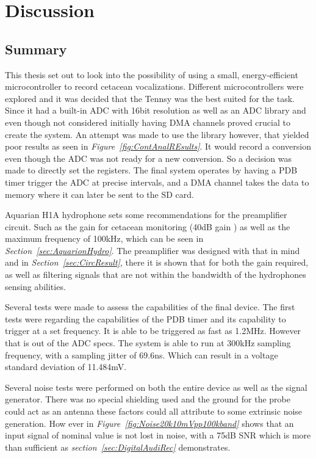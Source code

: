 \chapter{Discussion}

\section{Summary}

This thesis set out to look into the possibility of using a small, energy-efficient microcontroller to record cetacean vocalizations.
Different microcontrollers were explored and it was decided that the Tennsy was the best suited for the task.
Since it had a built-in ADC with 16bit resolution as well as an ADC library and even though not considered initially having DMA channels proved crucial to create the system.
An attempt was made to use the library however, that yielded poor results as seen in \textit{Figure~\ref{fig:ContAnalREsults}}. 
It would record a conversion even though the ADC was not ready for a new conversion.
So a decision was made to directly set the registers.
The final system operates by having a PDB timer trigger the ADC at precise intervals, and a DMA channel takes the data to memory where it can later be sent to the SD card.

Aquarian H1A hydrophone sets some recommendations for the preamplifier circuit. 
Such as the gain for cetacean monitoring (40dB gain ) as well as the maximum frequency of 100kHz, which can be seen in \textit{Section~\ref{sec:AquarionHydro}}.
The preamplifier was designed with that in mind and in \textit{Section~\ref{sec:CircResult}}, there it is shown that for both the gain required, as well as filtering signals that are not within the bandwidth of the hydrophones sensing abilities.

Several tests were made to assess the capabilities of the final device.
The first tests were regarding the capabilities of the PDB timer and its capability to trigger at a set frequency.
It is able to be triggered as fast as 1.2MHz.
However that is out of the ADC specs.
The system is able to run at 300kHz sampling frequency, with a sampling jitter of 69.6ns.
Which can result in a voltage standard deviation of 11.484mV.


Several noise tests were performed on both the entire device as well as the signal generator.
There was no special shielding used and the ground for the probe could act as an antenna these factors could all attribute to some extrinsic noise generation.
How ever in \textit{Figure~\ref{fig:Noise20k10mVpp100kband}} shows that an input signal of nominal value is not lost in noise, with a 75dB SNR which is more than sufficient as \textit{section~\ref{sec:DigitalAudiRec}} demonstrates.

